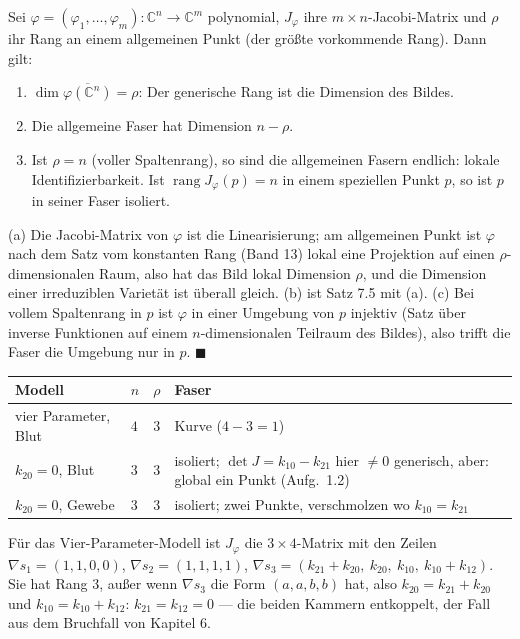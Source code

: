 \begin{merksatz}
Sei $\varphi = (\varphi_1, \ldots, \varphi_m)\colon\mathbb C^{n}\to\mathbb C^{m}$ polynomial, $J_\varphi$ ihre $m\times n$-Jacobi-Matrix und $\rho$ ihr Rang an einem allgemeinen Punkt (der größte vorkommende Rang). Dann gilt:
\begin{enumerate}[label=(\alph*), leftmargin=1.6em]
\item $\dim\overline{\varphi(\mathbb C^{n})} = \rho$: Der generische Rang ist die Dimension des Bildes.
\item Die allgemeine Faser hat Dimension $n - \rho$.
\item Ist $\rho = n$ (voller Spaltenrang), so sind die allgemeinen Fasern endlich: lokale Identifizierbarkeit. Ist $\operatorname{rang}J_\varphi(p) = n$ in einem speziellen Punkt $p$, so ist $p$ in seiner Faser isoliert.
\end{enumerate}

(a) Die Jacobi-Matrix von $\varphi$ ist die Linearisierung; am allgemeinen Punkt ist $\varphi$ nach dem Satz vom konstanten Rang (Band 13) lokal eine Projektion auf einen $\rho$-dimensionalen Raum, also hat das Bild lokal Dimension $\rho$, und die Dimension einer irreduziblen Varietät ist überall gleich. (b) ist Satz 7.5 mit (a). (c) Bei vollem Spaltenrang in $p$ ist $\varphi$ in einer Umgebung von $p$ injektiv (Satz über inverse Funktionen auf einem $n$-dimensionalen Teilraum des Bildes), also trifft die Faser die Umgebung nur in $p$. $\blacksquare$

\begin{center}
{\small
\renewcommand{\arraystretch}{1.5}
\begin{tabular}{@{}P{3.4cm}P{1.0cm}P{1.0cm}P{3.0cm}@{}}
\toprule
\textbf{Modell} & $n$ & $\rho$ & \textbf{Faser}\\
\midrule
vier Parameter, Blut & $4$ & $3$ & Kurve ($4 - 3 = 1$)\\
$k_{20} = 0$, Blut & $3$ & $3$ & isoliert; $\det J = k_{10} - k_{21}$ hier $\ne 0$ generisch, aber: global ein Punkt (Aufg.~1.2)\\
$k_{20} = 0$, Gewebe & $3$ & $3$ & isoliert; zwei Punkte, verschmolzen wo $k_{10} = k_{21}$\\
\bottomrule
\end{tabular}}
\end{center}
Für das Vier-Parameter-Modell ist $J_\varphi$ die $3\times4$-Matrix mit den Zeilen $\nabla s_1 = (1, 1, 0, 0)$, $\nabla s_2 = (1, 1, 1, 1)$, $\nabla s_3 = (k_{21} + k_{20},\ k_{20},\ k_{10},\ k_{10} + k_{12})$. Sie hat Rang $3$, außer wenn $\nabla s_3$ die Form $(a, a, b, b)$ hat, also $k_{20} = k_{21} + k_{20}$ und $k_{10} = k_{10} + k_{12}$: $k_{21} = k_{12} = 0$ --- die beiden Kammern entkoppelt, der Fall aus dem Bruchfall von Kapitel 6.


\end{merksatz}
